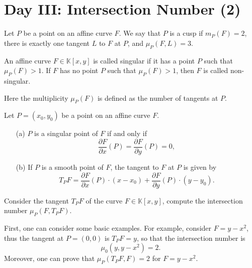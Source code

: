 \documentclass[10pt]{article}
\begin{document}
\section{Day III: Intersection Number (2)}

\begin{definition}[Cusps]
  Let \( P \) be a point on an affine curve \( F \). We say that \( P \) is a cusp if \( m_P(F) = 2 \), there is exactly one tangent \( L \) to \( F \) at \( P \), and \( \mu_P(F,L) = 3 \).
\end{definition}

\begin{definition}
  An affine curve $ F \in \mathbb{K}[x,y]$ is called singular if it has a point $ P$ such that $ \mu_{P}(F) > 1$. If $ F$ has no point $ P$ such that $ \mu_{P}(F) > 1$, then $ F$ is called non-singular.
\end{definition}
Here the multiplicity $ \mu_{P}(F)$ is defined as the number of tangents at $ P$.
\begin{proposition}
  Let \( P = (x_0, y_0) \) be a point on an affine curve \( F \).
  \begin{enumerate}
    \item[(a)] \( P \) is a singular point of \( F \) if and only if
      \begin{equation*}
        \frac{\partial F}{\partial x}(P) = \frac{\partial F}{\partial y}(P) = 0,
      \end{equation*}
    \item[(b)] If \( P \) is a smooth point of \( F \), the tangent to \( F \) at \( P \) is given by
      \begin{equation*}
        T_P F = \frac{\partial F}{\partial x}(P) \cdot (x - x_0) + \frac{\partial F}{\partial y}(P) \cdot (y - y_0).
      \end{equation*}
  \end{enumerate}
\end{proposition}

\begin{example}
  Consider the tangent $ T_{P}F$ of the curve $ F \in \mathbb{K}[x,y]$, compute the intersection number $ \mu_{P}(F,T_{P}F)$.
\end{example}
\begin{solution}
  First, one can consider some basic examples. For example, consider $ F = y - x^{2}$, thus the tangent at $ P = (0,0)$ is $ T_{P}F = y$, so that the intersection number is
  \begin{equation*}
    \mu_{0}(y, y - x^{2}) = 2.
  \end{equation*}
  Moreover, one can prove that $ \mu_{P}(T_{P}F, F) = 2$ for $ F = y - x^{2}$.
\end{solution}
\end{document}
